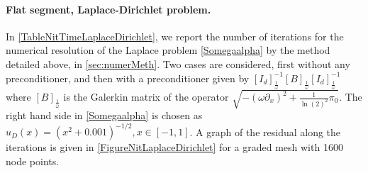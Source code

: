 \documentclass[a4paper]{article}
\begin{document}
\paragraph{Flat segment, Laplace-Dirichlet problem.} 
In \autoref{TableNitTimeLaplaceDirichlet}, we report the number of iterations for the numerical resolution of the Laplace problem \eqref{Somegaalpha} 
by the method detailed above, in \autoref{sec:numerMeth}. Two cases are considered, first without any preconditioner, and then with a preconditioner given 
by $[I_d]_\frac{1}{\omega}^{-1} \left[B \right]_\frac{1}{\omega} [I_d]_\frac{1}{\omega}^{-1}$ where
$[B]_\frac{1}{\omega}$ is the Galerkin matrix of the operator $\sqrt{ -(\omega \partial_x)^2 + \frac{1}{\ln(2)^2} \pi_0}$. The right hand 
side in \eqref{Somegaalpha} is chosen as $u_D(x) = (x^2 + 0.001)^{-1/2}, x \in [-1,1]$. A graph of the residual along the iterations is given in \autoref{FigureNitLaplaceDirichlet} for a graded mesh with 1600 node points. 
\end{document}
